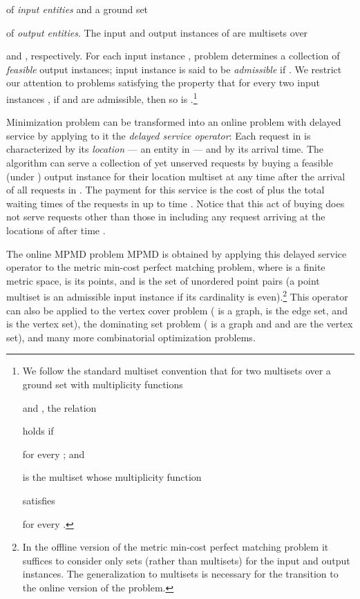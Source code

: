 \documentclass[11pt]{article}
\def\LongVersion{}
\def\LongVersionEnd{}
\def\ShortVersion{}
\def\ShortVersionEnd{}
\theoremstyle{definition}
\theoremstyle{plain}
\theoremstyle{definition}
\theoremstyle{plain}
\theoremstyle{definition}
\theoremstyle{plain}
\begin{document}
of \emph{input entities} and a ground set

of \emph{output entities}.
The input and output instances of  are multisets over

and
,
respectively.
For each input instance , problem 
determines a collection  of \emph{feasible}
output instances;
input instance  is said to be \emph{admissible} if
.
We restrict our attention to problems  satisfying
the property that for every two input instances
,
if  and  are admissible, then so is
.\footnote{We follow the standard multiset convention that for two multisets  over
a ground set  with multiplicity functions

and
,
the relation

holds if

for every
; and

is the multiset whose multiplicity function

satisfies

for every
.
}

Minimization problem  can be transformed into an online
problem with delayed service  by applying to it the
\emph{delayed service operator}:
Each request in  is characterized by its \emph{location} ---
an entity in  ---  and by its arrival time.
The algorithm can serve a collection  of yet unserved requests by buying a
feasible (under ) output instance  for their location multiset
at any time  after the arrival of all requests in .
The payment for this service is the cost of  plus the total waiting times
of the requests in  up to time .
Notice that this act of buying  does not serve requests other than those in
 including any request arriving at the locations of  after time .

\LongVersion The online MPMD problem
\LongVersionEnd \ShortVersion MPMD
\ShortVersionEnd is obtained by applying this delayed service operator to the
metric min-cost perfect matching problem, where
 is a finite metric space,
 is its points, and
 is the set of
\LongVersion unordered
\LongVersionEnd point pairs (a point multiset is an admissible input instance if its
cardinality is even).\footnote{In the offline version of the metric min-cost perfect matching problem it
suffices to consider only sets (rather than multisets) for the input and
output instances.
The generalization to multisets is necessary for the transition to the online
version of the problem.
}
This operator can also be applied to
the vertex cover problem
( is a graph,  is the edge set, and
 is the vertex set),
the dominating set problem
( is a graph and  and
 are the vertex set),
and many more combinatorial optimization problems.
\end{document}
